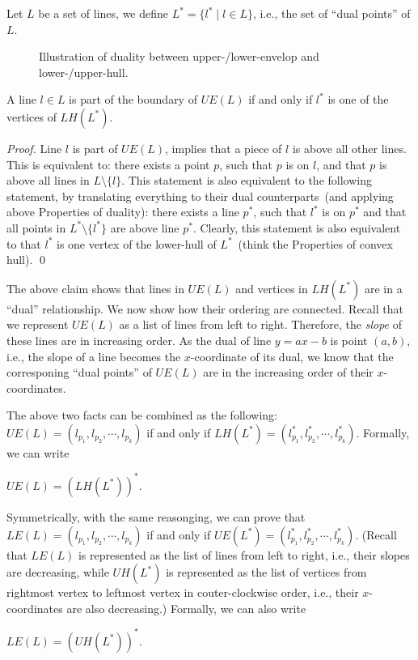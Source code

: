 Let $L$ be a set of lines, we define $L^* = \{l^* \mid l \in L\}$, i.e., the set of ``dual points'' of $L$.


\begin{figure}[h!]
\centering{}
\caption{Illustration of duality between upper-/lower-envelop and lower-/upper-hull.}
\end{figure}


\begin{claim}
A line $l\in L$ is part of the boundary of $UE(L)$ if and only if $l^*$ is one of the vertices
of $LH(L^*)$.
\end{claim}

{\it Proof.}
Line $l$ is part of $UE(L)$, implies that a piece of $l$ is above all other lines.
This is equivalent to: there exists a point $p$, such that $p$ is on $l$, and that
$p$ is above all lines in $L \setminus \{l\}$.
This statement is also equivalent to the following statement, 
by translating everything to their dual counterparts~(and applying above Properties of duality):
there exists a line $p^*$, such that $l^*$ is on $p^*$ and that
all points in $L^* \setminus \{l^*\}$ are above line $p^*$.
Clearly, this statement is also equivalent to that 
$l^*$ is one vertex of the lower-hull of $L^*$~(think the Properties of convex hull).
\qed

The above claim shows that lines in $UE(L)$ and
vertices in $LH(L^*)$ are in a ``dual'' relationship.
We now show how their ordering are connected.
Recall that we represent $UE(L)$ as a list of lines from left to right. Therefore, the
\emph{slope} of these lines are in increasing order. As the dual of line $y = ax - b$
is point $(a, b)$, i.e., the slope of a line becomes the $x$-coordinate of its dual,
we know that the corresponing ``dual points'' of $UE(L)$ are in the increasing
order of their $x$-coordinates.

The above two facts can be combined as the following: 
$UE(L) = (l_{p_1}, l_{p_2}, \cdots, l_{p_k})$ if and only if
$LH(L^*) = (l^*_{p_1}, l^*_{p_2}, \cdots, l^*_{p_k})$.
Formally, we can write
\begin{fact}
$UE(L) = (LH(L^*))^*$.
\end{fact}

Symmetrically, with the same reasonging, we can prove that
$LE(L) = (l_{p_1}, l_{p_2}, \cdots, l_{p_k})$ if and only if
$UE(L^*) = (l^*_{p_1}, l^*_{p_2}, \cdots, l^*_{p_k})$. (Recall
that $LE(L)$ is represented as the list of lines from left to right, i.e., their slopes are decreasing,
while $UH(L^*)$ is represented as the list of vertices
from rightmost vertex to leftmost vertex in couter-clockwise order, i.e., their $x$-coordinates are also decreasing.)
Formally, we can also write
\begin{fact}
$LE(L) = (UH(L^*))^*$.
\end{fact}
